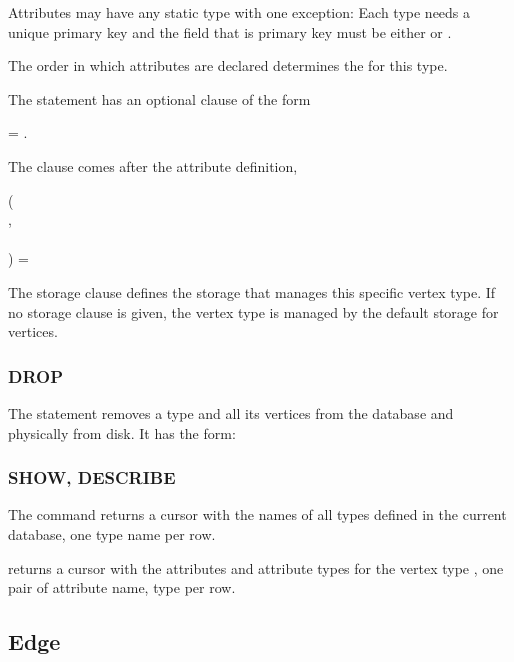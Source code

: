 Attributes may have any static type with one exception:
Each type needs a unique primary key and the field
that is primary key must be either
 or .

The order in which attributes are declared
determines the  for this type.

The  statement has an optional
 clause of the form

 = .

The  clause comes after the
attribute definition, \eg\

\begin{minipage}{\textwidth}
  ( \\
\hspace*{1cm}  , \\
\hspace*{1cm}  \\
)  = 
\end{minipage}

The storage clause defines the storage
that manages this specific vertex type.
If no storage clause is given, the vertex type
is managed by the default storage for vertices.

\subsubsection{DROP}
The  statement removes a type
and all its vertices
from the database and physically from disk.
It has the form:

 

\subsubsection{SHOW, DESCRIBE}
The command 
returns a cursor with the names of all
types defined in the current database,
one type name per row.

 
returns a cursor with the attributes
and attribute types for the vertex type
, one pair of
attribute name, type per row.

\subsection{Edge}
